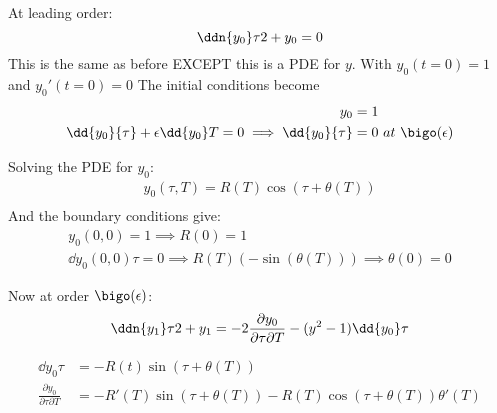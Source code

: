 \documentclass{/home/janmebows/Documents/LatexTemplates/myassignment}
\begin{document}
At leading order:
\[\ddn{y_0}\tau2 + y_0 = 0\]
This is the same as before EXCEPT this is a PDE for $y$.
With $y_0(t=0) = 1$ and $y_0'(t=0)=0$
The initial conditions become
\begin{align*}
    y_0 &=1\\
    \dd{y_0}{\tau} + \epsilon \dd{y_0}T = 0\implies \dd{y_0}{\tau} &= 0 \ at \ \bigo(\epsilon)
\end{align*}


Solving the PDE for $y_0$:
\begin{align*}
    y_0(\tau,T) = R(T)\cos(\tau +\theta(T))\\
\end{align*}
And the boundary conditions give:
\begin{align*}
    y_0(0,0) = 1 \implies R(0) = 1\\
    \dd{y_0(0,0)}{\tau} = 0 \implies R(T)(-\sin(\theta(T)))\implies \theta(0) = 0
\end{align*}

Now at order $\bigo(\epsilon)$:
\[
    \ddn{y_1}\tau2 + y_1 = - 2\frac{\partial y_0}{\partial \tau \partial T} - (y^2-1)\dd{y_0}\tau
\]

\begin{align*}
    \dd{y_0}\tau &= -R(t) \sin(\tau + \theta(T))\\
    \frac{\partial y_0}{\partial \tau \partial T} &= -R'(T)\sin(\tau+\theta(T)) -R(T)\cos(\tau+\theta(T))\theta'(T) 
\end{align*}
\end{document}
